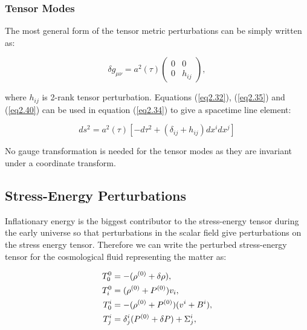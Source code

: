 \documentclass[a4paper,12pt,twoside]{report}
\begin{document}
\subsubsection{Tensor Modes} \label{subsubsec:TensModes}

The most general form of the tensor metric perturbations can be simply written as:

\begin{equation} \label{eq2.40}
\delta g_{\mu \nu} = a^{2}(\tau) \begin{pmatrix}
0 & 0 \\[0.3em]
0 & h_{ij}
\end{pmatrix},
\end{equation}

where $h_{ij}$ is 2-rank tensor perturbation. Equations (\ref{eq2.32}), (\ref{eq2.35}) and (\ref{eq2.40}) can be used in equation (\ref{eq2.34}) to give a spacetime line element:

\begin{equation} \label{eq2.41}
ds^{2} = a^{2}(\tau) \left[-d\tau^{2} + (\delta_{ij} + h_{ij})dx^{i}dx^{j} \right]
\end{equation}

No gauge transformation is needed for the tensor modes as they are invariant under a coordinate transform.

\subsection{Stress-Energy Perturbations} \label{StreEnePerturb}

Inflationary energy is the biggest contributor to the stress-energy tensor during the early universe so that perturbations in the scalar field give perturbations on the stress energy tensor. Therefore we can write the perturbed stress-energy tensor for the cosmological fluid representing the matter as:

\begin{subequations} \label{eq2.42}
\begin{align}
\tensor*{T}{_0^0} &= -(\rho^{(0)} + \delta \rho), \label{eq2.42a} \\
\tensor*{T}{_i^0} &= (\rho^{(0)} + P^{(0)})v_{i}, \label{eq2.42b} \\
\tensor*{T}{_0^i} &= -(\rho^{(0)} + P^{(0)})(v^{i} + B^{i}), \label{eq2.42c} \\
\tensor*{T}{^i_j} &= \tensor*{\delta}{^i_j}(P^{(0)} + \delta P) + \tensor*{\Sigma}{^i_j}, \label{eq2.42d}
\end{align}
\end{subequations}
\end{document}
